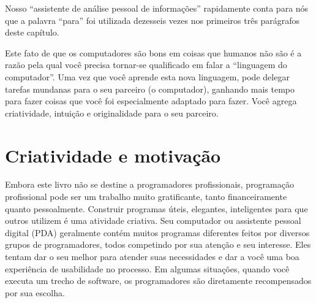 Nosso ``assistente de análise pessoal de informações'' rapidamente
conta para nós que a palavra ``para'' foi utilizada dezesseis vezes nos
primeiros três parágrafos deste capítulo.

Este fato de que os computadores são bons em coisas
que humanos não são é a razão pela qual você precisa tornar-se
qualificado em falar a ``linguagem do computador''. Uma vez
que você aprende esta nova linguagem, pode delegar tarefas
mundanas para o seu parceiro (o computador), ganhando mais tempo
para fazer coisas que você foi especialmente adaptado para fazer. Você agrega
criatividade, intuição e originalidade para o seu parceiro. 

\section{Criatividade e motivação}


Embora este livro não se destine a programadores profissionais, programação
profissional pode ser um trabalho muito gratificante, tanto financeiramente
quanto pessoalmente. Construir programas úteis, elegantes, inteligentes para
que outros utilizem é uma atividade criativa. Seu computador ou assistente
pessoal digital (PDA) geralmente contém muitos programas diferentes feitos por
diversos grupos de programadores, todos competindo por sua atenção e seu 
interesse. Eles tentam dar o seu melhor para atender suas necessidades e dar a
você uma boa experiência de usabilidade no processo. Em algumas situações,
quando você executa um trecho de software, os programadores são diretamente
recompensados por sua escolha.

